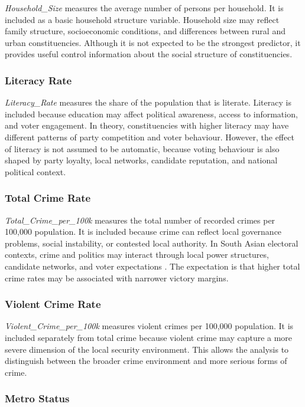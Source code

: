 \documentclass[12pt,a4paper]{article}
\begin{document}
\textit{Household\_Size} measures the average number of persons per household. It is included as a basic household structure variable. Household size may reflect family structure, socioeconomic conditions, and differences between rural and urban constituencies. Although it is not expected to be the strongest predictor, it provides useful control information about the social structure of constituencies.

\subsubsection{Literacy Rate}

\textit{Literacy\_Rate} measures the share of the population that is literate. Literacy is included because education may affect political awareness, access to information, and voter engagement. In theory, constituencies with higher literacy may have different patterns of party competition and voter behaviour. However, the effect of literacy is not assumed to be automatic, because voting behaviour is also shaped by party loyalty, local networks, candidate reputation, and national political context.

\subsubsection{Total Crime Rate}

\textit{Total\_Crime\_per\_100k} measures the total number of recorded crimes per 100,000 population. It is included because crime can reflect local governance problems, social instability, or contested local authority. In South Asian electoral contexts, crime and politics may interact through local power structures, candidate networks, and voter expectations \citep{vaishnav2017}. The expectation is that higher total crime rates may be associated with narrower victory margins.

\subsubsection{Violent Crime Rate}

\textit{Violent\_Crime\_per\_100k} measures violent crimes per 100,000 population. It is included separately from total crime because violent crime may capture a more severe dimension of the local security environment. This allows the analysis to distinguish between the broader crime environment and more serious forms of crime.

\subsubsection{Metro Status}
\end{document}
